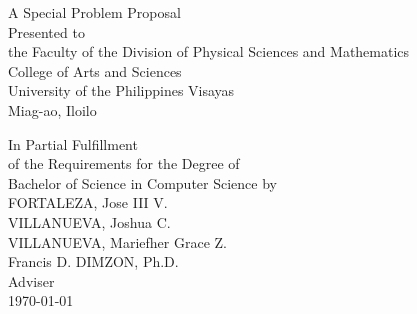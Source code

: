 \begin{titlepage}
    \centering
    
    
    \vspace{1cm}
    A Special Problem Proposal\\
    Presented to\\
    the Faculty of the Division of Physical Sciences and Mathematics\\
    College of Arts and Sciences\\
    University of the Philippines Visayas\\
    Miag-ao, Iloilo
    
    \vspace{1cm}
    In Partial Fulfillment\\
    of the Requirements for the Degree of\\
    Bachelor of Science in Computer Science
    \vspace{1cm}
    by\\
    
    \vspace{1cm}
    FORTALEZA, Jose III V. \\
    VILLANUEVA, Joshua C.  \\
    VILLANUEVA, Mariefher Grace Z.  \\
    
    \vspace{1cm}
    Francis D. DIMZON, Ph.D. \\
    Adviser\\
    
    
    \vspace{1.75cm}
    \today
    \end{titlepage}